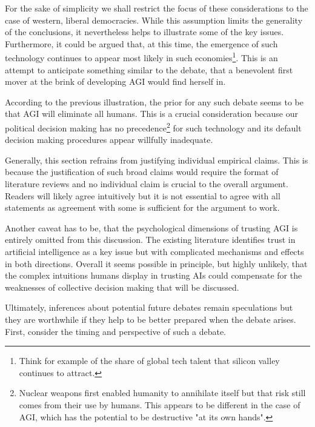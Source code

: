\documentclass[12pt, a4paper]{article}
\begin{document}
			For the sake of simplicity we shall restrict the focus of these considerations to the case of western, liberal democracies.
			While this assumption limits the generality of the conclusions, it nevertheless helps to illustrate some of the key issues.
			Furthermore, it could be argued that, at this time, the emergence of such technology continues to appear most likely in such economies\footnote{Think for example of the share of global tech talent that silicon valley continues to attract.}.
			This is an attempt to anticipate something similar to the debate, that a benevolent first mover at the brink of developing AGI would find herself in.
			
			According to the previous illustration, the prior for any such debate seems to be that AGI will eliminate all humans.
			This is a crucial consideration because our political decision making has no precedence\footnote{Nuclear weapons first enabled humanity to annihilate itself but that risk still comes from their use by humans. This appears to be different in the case of AGI, which has the potential to be destructive "at its own hands".} for such technology and its default decision making procedures appear willfully inadequate.
			
			Generally, this section refrains from justifying individual empirical claims.
			This is because the justification of such broad claims would require the format of literature reviews and no individual claim is crucial to the overall argument.
			Readers will likely agree intuitively but it is not essential to agree with all statements as agreement with some is sufficient for the argument to work.
			
			Another caveat has to be, that the psychological dimensions of trusting AGI is entirely omitted from this discussion.
			The existing literature identifies trust in artificial intelligence as a key issue but with complicated mechanisms and effects in both directions.
			Overall it seems possible in principle, but highly unlikely, that the complex intuitions humans display in trusting AIs could compensate for the weaknesses of collective decision making that will be discussed.
			
			Ultimately, inferences about potential future debates remain speculations but they are worthwhile if they help to be better prepared when the debate arises.
			First, consider the timing and perspective of such a debate.
			
\end{document}
